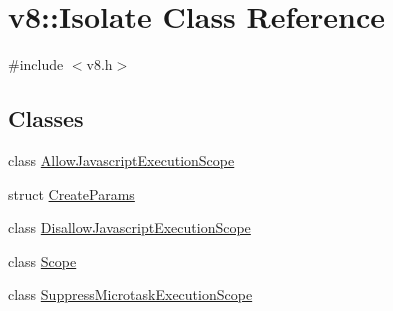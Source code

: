 \hypertarget{classv8_1_1_isolate}{}\section{v8\+:\+:Isolate Class Reference}
\label{classv8_1_1_isolate}


{\ttfamily \#include $<$v8.\+h$>$}

\subsection*{Classes}
\begin{DoxyCompactItemize}
\item 
class \hyperlink{classv8_1_1_isolate_1_1_allow_javascript_execution_scope}{Allow\+Javascript\+Execution\+Scope}
\item 
struct \hyperlink{structv8_1_1_isolate_1_1_create_params}{Create\+Params}
\item 
class \hyperlink{classv8_1_1_isolate_1_1_disallow_javascript_execution_scope}{Disallow\+Javascript\+Execution\+Scope}
\item 
class \hyperlink{classv8_1_1_isolate_1_1_scope}{Scope}
\item 
class \hyperlink{classv8_1_1_isolate_1_1_suppress_microtask_execution_scope}{Suppress\+Microtask\+Execution\+Scope}
\end{DoxyCompactItemize}
